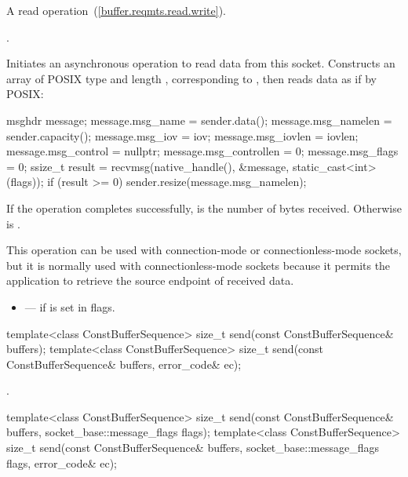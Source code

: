 \begin{itemdescr}
\pnum
A read operation~(\ref{buffer.reqmts.read.write}).

\pnum
\completionsig {}.

\pnum
\effects Initiates an asynchronous operation to read data from this socket. Constructs an array  of POSIX type  and length , corresponding to , then reads data as if by POSIX:
\begin{codeblock}
msghdr message;
message.msg_name = sender.data();
message.msg_namelen = sender.capacity();
message.msg_iov = iov;
message.msg_iovlen = iovlen;
message.msg_control = nullptr;
message.msg_controllen = 0;
message.msg_flags = 0;
ssize_t result = recvmsg(native_handle(), &message, static_cast<int>(flags));
if (result >= 0)
  sender.resize(message.msg_namelen);
\end{codeblock}


\pnum
If the operation completes successfully,  is the number of bytes received. Otherwise  is .

\pnum
 \begin{note} This operation can be used with connection-mode or connectionless-mode sockets, but it is normally used with connectionless-mode sockets because it permits the application to retrieve the source endpoint of received data. \end{note}

\pnum
\errors
\begin{itemize}
\item
{} --- if  is set in flags.
\end{itemize}
\end{itemdescr}

\begin{itemdecl}
template<class ConstBufferSequence>
  size_t send(const ConstBufferSequence& buffers);
template<class ConstBufferSequence>
  size_t send(const ConstBufferSequence& buffers, error_code& ec);
\end{itemdecl}

\begin{itemdescr}
\pnum
\returns {}.
\end{itemdescr}

\begin{itemdecl}
template<class ConstBufferSequence>
  size_t send(const ConstBufferSequence& buffers,
              socket_base::message_flags flags);
template<class ConstBufferSequence>
  size_t send(const ConstBufferSequence& buffers,
              socket_base::message_flags flags, error_code& ec);
\end{itemdecl}

